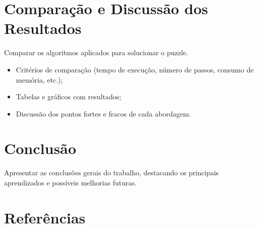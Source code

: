 \documentclass[12pt,a4paper]{article}
\begin{document}
\section{Comparação e Discussão dos Resultados}
Comparar os algoritmos aplicados para solucionar o puzzle.
\begin{itemize}
\item Critérios de comparação (tempo de execução, número de passos, consumo de memória, etc.);
\item Tabelas e gráficos com resultados;
\item Discussão dos pontos fortes e fracos de cada abordagem.
\end{itemize}

\section{Conclusão}
Apresentar as conclusões gerais do trabalho, destacando os principais aprendizados e possíveis melhorias futuras.

\section*{Referências}


\end{document}
